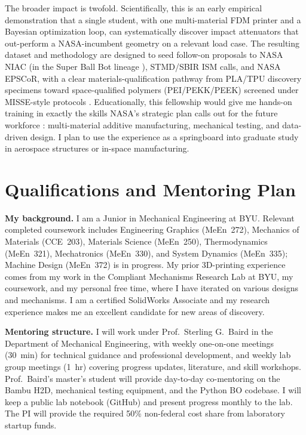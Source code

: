 \documentclass[11pt]{article}
\begin{document}
The broader impact is twofold.  Scientifically, this is an early empirical
demonstration that a single student, with one multi-material FDM printer
and a Bayesian optimization loop, can systematically discover impact
attenuators that out-perform a NASA-incumbent geometry on a relevant load
case.  The resulting dataset and methodology are designed to seed follow-on
proposals to NASA NIAC (in the Super Ball Bot lineage
\citep{agogino2018superball,deitrich2022titan}), STMD/SBIR ISM calls, and
NASA EPSCoR, with a clear materials-qualification pathway from PLA/TPU
discovery specimens toward space-qualified polymers (PEI/PEKK/PEEK) screened
under MISSE-style protocols \citep{finckenor2023misse}.  Educationally, this
fellowship would give me hands-on training in exactly the skills NASA's
strategic plan calls out for the future workforce \citep{nasa2022strategic}:
multi-material additive manufacturing, mechanical testing, and data-driven
design.  I plan to use the experience as a springboard into graduate study
in aerospace structures or in-space manufacturing.

\section{Qualifications and Mentoring Plan}

\textbf{My background.} I am a Junior in Mechanical Engineering at BYU.
Relevant completed coursework includes Engineering Graphics (MeEn~272),
Mechanics of Materials (CCE~203), Materials Science (MeEn~250),
Thermodynamics (MeEn~321), Mechatronics (MeEn~330), and
System Dynamics (MeEn~335); Machine Design (MeEn~372) is in progress.  My
prior 3D-printing experience comes from my work in the Compliant Mechanisms
Research Lab at BYU, my coursework, and my personal free time, where I have
iterated on various designs and mechanisms.  I am a certified SolidWorks
Associate and my research experience makes me an excellent candidate for new
areas of discovery.

\textbf{Mentoring structure.} I will work under Prof.~Sterling G.~Baird in the
Department of Mechanical Engineering, with weekly one-on-one meetings
(30~min) for technical guidance and professional development, and weekly lab
group meetings (1~hr) covering progress updates, literature, and skill
workshops.  Prof.~Baird's master's student will provide day-to-day co-mentoring
on the Bambu H2D, mechanical testing equipment, and the Python BO codebase.
I will keep a public lab notebook (GitHub) and present progress monthly to
the lab.  The PI will provide the required 50\% non-federal cost share from
laboratory startup funds.

{\footnotesize
\setlength{\bibsep}{0pt plus 0.3ex}


}
\end{document}
